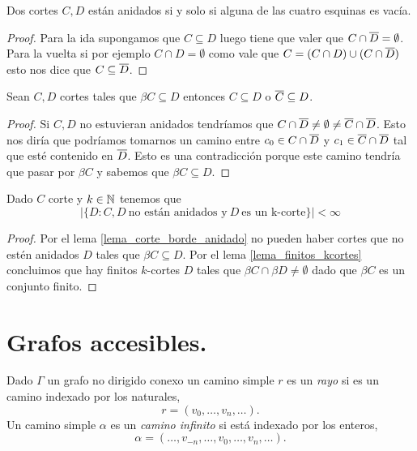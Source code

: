 \documentclass[tesis.tex]{subfiles}
\begin{document}
\begin{lema}
	Dos cortes $C,D$ están anidados si y solo si alguna de las cuatro esquinas es vacía.
\end{lema}
\begin{proof}
	Para la ida supongamos que $C \subseteq D$ luego tiene que valer que $C \cap \overline D = \emptyset$.
	Para la vuelta si por ejemplo $C \cap D = \emptyset$ como vale que $C = (C \cap D) \cup (C \cap \overline D)$ esto nos dice que $C \subseteq \overline D$.
	
\end{proof}

\begin{lema}\label{lema_corte_borde_anidado}
	Sean $C,D$ cortes tales que $\beta C \subseteq D$ entonces $C \subseteq D$ o $\overline C \subseteq D$.
\end{lema}
\begin{proof}
	Si $C,D$ no estuvieran anidados tendríamos que $C \cap \overline D \neq \emptyset \neq \overline C \cap \overline D$.
	Esto nos diría que podríamos tomarnos un camino entre $c_0 \in C \cap \overline D$ y $c_1 \in \overline C \cap \overline D$ tal que esté contenido en $\overline D$.
	Esto es una contradicción porque este camino tendría que pasar por $\beta C$ y sabemos que $\beta C \subseteq D$.
	
\end{proof}


\begin{lema}
	Dado $C$ corte y $k \in \mathbb{N}$ tenemos que 
	\[
	| \{  D : C, D \ \text{no están anidados y} \ D \ \text{es un k-corte}   \} | < \infty
	\]
\end{lema}
\begin{proof}
	Por el lema \ref{lema_corte_borde_anidado} no pueden haber cortes que no estén anidados $D$ tales que $\beta C \subseteq D$.
	Por el lema \ref{lema_finitos_kcortes} concluimos que hay finitos $k$-cortes $D$ tales que $\beta C \cap \beta D \neq \emptyset$ dado que $\beta C$ es un conjunto finito.
				
\end{proof}


\section{Grafos accesibles.}\label{secc_grafos_accesibles}

\begin{deff}
	Dado $\Gamma$ un grafo no dirigido conexo un camino simple $r$ es un \emph{rayo} si es un camino indexado por los naturales,
	\[
	r = (v_0, \dots, v_{n}, \dots).
	\]	
	Un camino simple $\alpha$ es un \emph{camino infinito} si está indexado por los enteros,
	\[
	\alpha = ( \dots, v_{-n}, \dots, v_0, \dots, v_{n}, \dots ).
	\]
\end{deff}		
\end{document}
